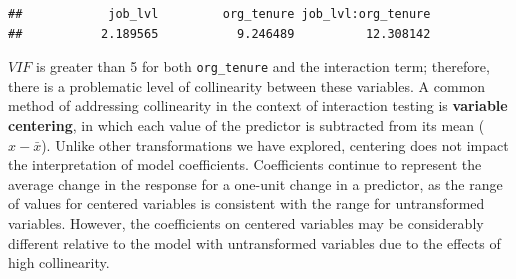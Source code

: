 \documentclass[
]{book}
\begin{document}
\begin{verbatim}
##            job_lvl         org_tenure job_lvl:org_tenure 
##           2.189565           9.246489          12.308142
\end{verbatim}

\(VIF\) is greater than 5 for both \texttt{org\_tenure} and the interaction term; therefore, there is a problematic level of collinearity between these variables.
A common method of addressing collinearity in the context of interaction testing is \textbf{variable centering}, in which each value of the predictor is subtracted from its mean (\(x - \bar{x}\)). Unlike other transformations we have explored, centering does not impact the interpretation of model coefficients. Coefficients continue to represent the average change in the response for a one-unit change in a predictor, as the range of values for centered variables is consistent with the range for untransformed variables. However, the coefficients on centered variables may be considerably different relative to the model with untransformed variables due to the effects of high collinearity.

\providecommand{\docline}[3]{\noalign{\global\setlength{\arrayrulewidth}{#1}}\arrayrulecolor[HTML]{#2}\cline{#3}}

\setlength{\tabcolsep}{2pt}

\renewcommand*{\arraystretch}{1.5}
\end{document}
